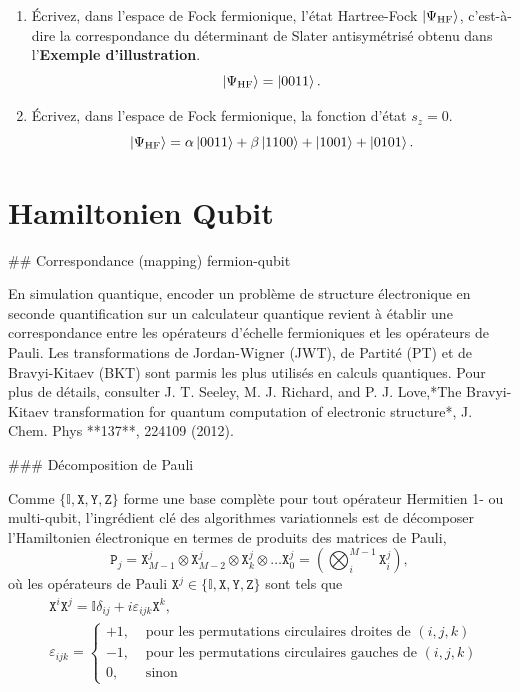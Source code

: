 \documentclass[12pt,a4paper]{article} %
\numberwithin{equation}{section} %
\numberwithin{figure}{section} %
\numberwithin{table}{section} %
\begin{document}
\begin{enumerate}
    \item Écrivez, dans l'espace de Fock fermionique, l'état Hartree-Fock $\ket{\Psi_{\rm HF}}$, c'est-à-dire la correspondance du déterminant de Slater antisymétrisé obtenu dans l'\textbf{Exemple d'illustration}.
    \begin{equation}
    \label{eq:hf_state}
    \ket{\Psi_{\rm HF}} = \ket{0011}.
    \end{equation}
    \item Écrivez, dans l'espace de Fock fermionique, la fonction d'état $s_z = 0$.
    \begin{equation}
    \label{eq:sz_state}
    \ket{\Psi_{\rm HF}} = \alpha \ket{0011} + \beta \ket{1100} + \ket{1001} + \ket{0101}.
    \end{equation}
\end{enumerate}

\section{Hamiltonien Qubit}

## Correspondance (mapping) fermion-qubit

En simulation quantique, encoder un problème de structure électronique en seconde quantification sur un calculateur quantique revient à établir une correspondance entre les opérateurs d'échelle fermioniques et les opérateurs de Pauli. Les transformations de Jordan-Wigner (JWT), de Partité (PT) et de Bravyi-Kitaev (BKT) sont parmis les plus utilisés en calculs quantiques. Pour plus de détails, consulter J. T. Seeley, M. J. Richard, and P. J. Love,*The Bravyi-Kitaev transformation for quantum computation of electronic structure*, J. Chem. Phys **137**, 224109 (2012).

### Décomposition de Pauli

Comme $\{\mathbb{I}, \mathtt{X}, \mathtt{Y}, \mathtt{Z}\}$ forme une base complète pour tout opérateur Hermitien 1- ou multi-qubit, l'ingrédient clé des algorithmes variationnels est de décomposer l'Hamiltonien électronique en termes de produits des matrices de Pauli,
\begin{equation}
\mathtt{P}_j=\mathtt{X}_{M-1}^j\otimes\mathtt{X}_{M-2}^j\otimes\mathtt{X}_k^j\otimes\dots\mathtt{X}_0^j
=\left(\bigotimes_i^{M-1}\mathtt{X}_i^j\right),
\end{equation}
où les opérateurs de Pauli $\mathtt{X}^j\in\{\mathbb{I},\mathtt{X},\mathtt{Y},\mathtt{Z}\}$ sont tels que
\begin{equation}
\begin{aligned}
    &\mathtt{X}^i\mathtt{X}^j=\mathbb{I}\delta_{ij}+i\varepsilon_{ijk}\mathtt{X}^k, \\
    &\varepsilon_{ijk}=\begin{cases}+1, & \text{ pour les permutations circulaires droites de } (i,j,k) \\
    -1, & \text{ pour les permutations circulaires gauches de }(i,j,k) \\
    0, & \text{ sinon} \end{cases}
\end{aligned}
\end{equation}
\end{document}
